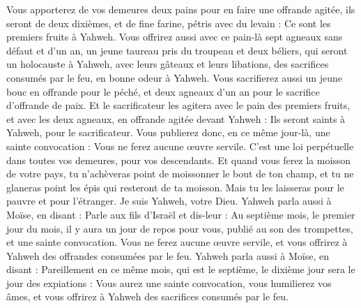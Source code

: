 \begin{multicols}{2}
Vous apporterez de vos demeures deux pains pour en faire une offrande agitée, ils seront de deux dixièmes, et de fine farine, pétris avec du levain : Ce sont les premiers fruits à Yahweh.
Vous offrirez aussi avec ce pain-là sept agneaux sans défaut et d'un an, un jeune taureau pris du troupeau et deux béliers, qui seront un holocauste à Yahweh, avec leurs gâteaux et leurs libations, des sacrifices consumés par le feu, en bonne odeur à Yahweh.
Vous sacrifierez aussi un jeune bouc en offrande pour le péché, et deux agneaux d'un an pour le sacrifice d'offrande de paix.
Et le sacrificateur les agitera avec le pain des premiers fruits, et avec les deux agneaux, en offrande agitée devant Yahweh : Ils seront saints à Yahweh, pour le sacrificateur.
Vous publierez donc, en ce même jour-là, une sainte convocation : Vous ne ferez aucune œuvre servile. C'est une loi perpétuelle dans toutes vos demeures, pour vos descendants.
Et quand vous ferez la moisson de votre pays, tu n'achèveras point de moissonner le bout de ton champ, et tu ne glaneras point les épis qui resteront de ta moisson. Mais tu les laisseras pour le pauvre et pour l'étranger. Je suis Yahweh, votre Dieu.
Yahweh parla aussi à Moïse, en disant :
Parle aux fils d'Israël et dis-leur : Au septième mois, le premier jour du mois, il y aura un jour de repos pour vous, publié au son des trompettes, et une sainte convocation.
Vous ne ferez aucune œuvre servile, et vous offrirez à Yahweh des offrandes consumées par le feu.
Yahweh parla aussi à Moïse, en disant :
Pareillement en ce même mois, qui est le septième, le dixième jour sera le jour des expiations : Vous aurez une sainte convocation, vous humilierez vos âmes, et vous offrirez à Yahweh des sacrifices consumés par le feu.

\end{multicols}
